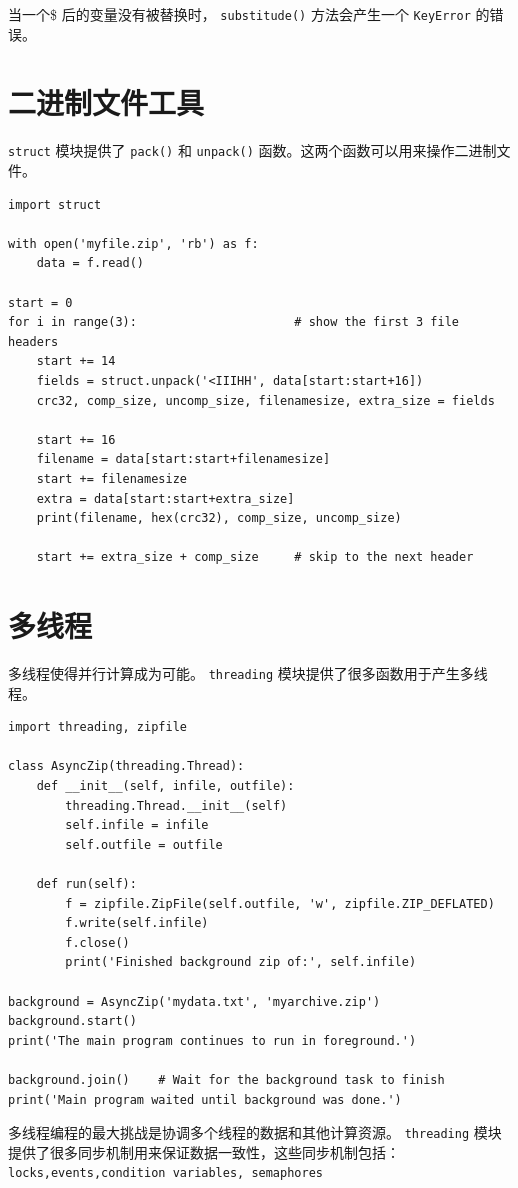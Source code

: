 \documentclass[10pt,a4paper,UTF8]{article}
\begin{document}
当一个\$ 后的变量没有被替换时， \texttt{substitude()} 方法会产生一个 \texttt{KeyError} 的错误。

\section{二进制文件工具}
\label{sec:orged15108}


\texttt{struct} 模块提供了 \texttt{pack()} 和 \texttt{unpack()} 函数。这两个函数可以用来操作二进制文件。
\begin{verbatim}
import struct

with open('myfile.zip', 'rb') as f:
    data = f.read()

start = 0
for i in range(3):                      # show the first 3 file headers
    start += 14
    fields = struct.unpack('<IIIHH', data[start:start+16])
    crc32, comp_size, uncomp_size, filenamesize, extra_size = fields

    start += 16
    filename = data[start:start+filenamesize]
    start += filenamesize
    extra = data[start:start+extra_size]
    print(filename, hex(crc32), comp_size, uncomp_size)

    start += extra_size + comp_size     # skip to the next header
\end{verbatim}
\section{多线程}
\label{sec:org8cdcb6d}


多线程使得并行计算成为可能。 \texttt{threading} 模块提供了很多函数用于产生多线程。

\begin{verbatim}
import threading, zipfile

class AsyncZip(threading.Thread):
    def __init__(self, infile, outfile):
        threading.Thread.__init__(self)
        self.infile = infile
        self.outfile = outfile

    def run(self):
        f = zipfile.ZipFile(self.outfile, 'w', zipfile.ZIP_DEFLATED)
        f.write(self.infile)
        f.close()
        print('Finished background zip of:', self.infile)

background = AsyncZip('mydata.txt', 'myarchive.zip')
background.start()
print('The main program continues to run in foreground.')

background.join()    # Wait for the background task to finish
print('Main program waited until background was done.')
\end{verbatim}
多线程编程的最大挑战是协调多个线程的数据和其他计算资源。 \texttt{threading} 模块提供了很多同步机制用来保证数据一致性，这些同步机制包括： \texttt{locks,events,condition variables, semaphores}
\end{document}
